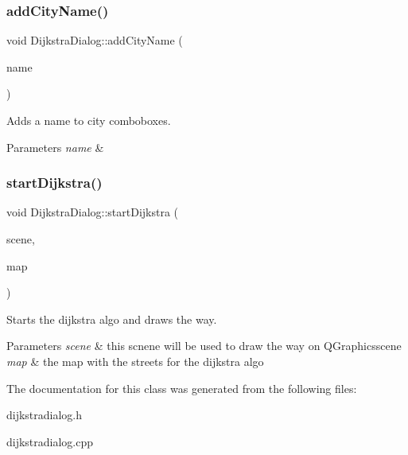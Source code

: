 \subsubsection{\texorpdfstring{add\+City\+Name()}{addCityName()}}
{\footnotesize\ttfamily void Dijkstra\+Dialog\+::add\+City\+Name (\begin{DoxyParamCaption}\item[{Q\+String}]{name }\end{DoxyParamCaption})}



Adds a name to city comboboxes. 


\begin{DoxyParams}{Parameters}
{\em name} & \\
\hline
\end{DoxyParams}
\mbox{\label{class_dijkstra_dialog_ae4bd48d8dc7d10e4cda0e8638bb1d22e}} 
\subsubsection{\texorpdfstring{start\+Dijkstra()}{startDijkstra()}}
{\footnotesize\ttfamily void Dijkstra\+Dialog\+::start\+Dijkstra (\begin{DoxyParamCaption}\item[{Q\+Graphics\+Scene \&}]{scene,  }\item[{\hyperlink{class_map}{Map} \&}]{map }\end{DoxyParamCaption})}



Starts the dijkstra algo and draws the way. 


\begin{DoxyParams}{Parameters}
{\em scene} & this scnene will be used to draw the way on Q\+Graphicsscene \\
\hline
{\em map} & the map with the streets for the dijkstra algo \\
\hline
\end{DoxyParams}


The documentation for this class was generated from the following files\+:\begin{DoxyCompactItemize}
\item 
dijkstradialog.\+h\item 
dijkstradialog.\+cpp\end{DoxyCompactItemize}

